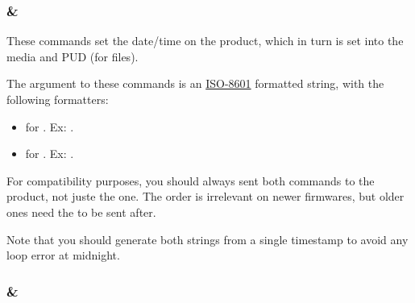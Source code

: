 \begin{table}[h]
\centering
{}
\caption{Final command for each Settings/State request}
\end{table}

\subsubsection{ \&\\}

These commands set the date/time on the product, which in turn is set into the media and PUD (for  files).

The argument to these commands is an \href{https://en.wikipedia.org/wiki/ISO_8601}{ISO-8601} formatted string, with the following formatters:
\begin{itemize}
\item{ for . Ex: .}
\item{ for . Ex: .}
\end{itemize}

For compatibility purposes, you should always sent both commands to the product, not juste the  one. The order is irrelevant on newer firmwares, but older ones need the  to be sent after.

Note that you should generate both strings from a single timestamp to avoid any loop error at midnight.

\subsubsection{ \&\\}

